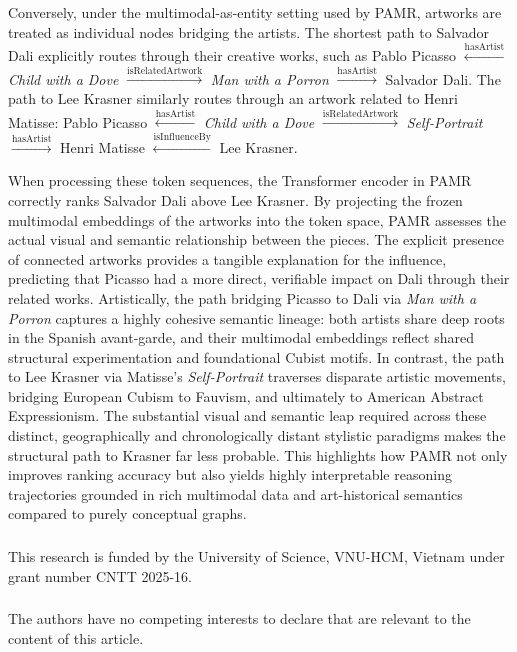 \documentclass[runningheads]{llncs}
\begin{document}
Conversely, under the multimodal-as-entity setting used by PAMR, artworks are treated as individual nodes bridging the artists. The shortest path to Salvador Dali explicitly routes through their creative works, such as Pablo Picasso $\xleftarrow{\text{hasArtist}}$ \textit{Child with a Dove} $\xrightarrow{\text{isRelatedArtwork}}$ \textit{Man with a Porron} $\xrightarrow{\text{hasArtist}}$ Salvador Dali. The path to Lee Krasner similarly routes through an artwork related to Henri Matisse: Pablo Picasso $\xleftarrow{\text{hasArtist}}$ \textit{Child with a Dove} $\xrightarrow{\text{isRelatedArtwork}}$ \textit{Self-Portrait} $\xrightarrow{\text{hasArtist}}$ Henri Matisse $\xleftarrow{\text{isInfluenceBy}}$ Lee Krasner.

When processing these token sequences, the Transformer encoder in PAMR correctly ranks Salvador Dali above Lee Krasner. By projecting the frozen multimodal embeddings of the artworks into the token space, PAMR assesses the actual visual and semantic relationship between the pieces. The explicit presence of connected artworks provides a tangible explanation for the influence, predicting that Picasso had a more direct, verifiable impact on Dali through their related works. Artistically, the path bridging Picasso to Dali via \textit{Man with a Porron} captures a highly cohesive semantic lineage: both artists share deep roots in the Spanish avant-garde, and their multimodal embeddings reflect shared structural experimentation and foundational Cubist motifs. In contrast, the path to Lee Krasner via Matisse's \textit{Self-Portrait} traverses disparate artistic movements, bridging European Cubism to Fauvism, and ultimately to American Abstract Expressionism. The substantial visual and semantic leap required across these distinct, geographically and chronologically distant stylistic paradigms makes the structural path to Krasner far less probable. This highlights how PAMR not only improves ranking accuracy but also yields highly interpretable reasoning trajectories grounded in rich multimodal data and art-historical semantics compared to purely conceptual graphs.

\begin{credits}
  \subsubsection{\ackname} This research is funded by the University of Science, VNU-HCM, Vietnam under grant number CNTT 2025-16.

  \subsubsection{\discintname}
  The authors have no competing interests to declare that are
  relevant to the content of this article.
\end{credits}
%
%
%


\end{document}
